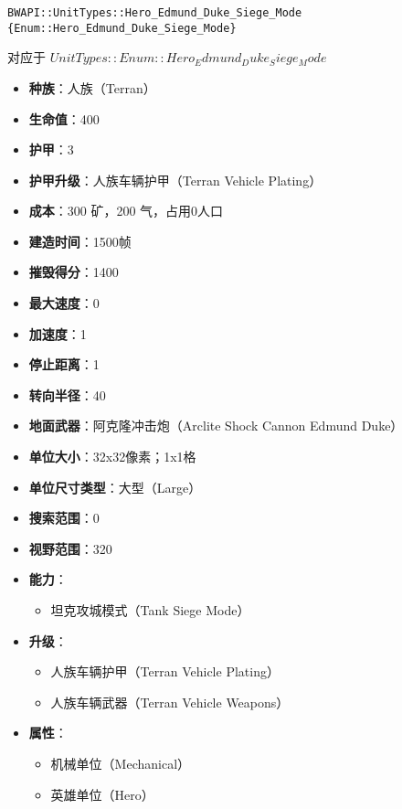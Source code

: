 \begin{tcolorbox}[colback=white, colframe=black!60!white, title=Hero\_Edmund\_Duke\_Siege\_Mode(), arc=0mm]
    \begin{verbatim}
BWAPI::UnitTypes::Hero_Edmund_Duke_Siege_Mode {Enum::Hero_Edmund_Duke_Siege_Mode}
    \end{verbatim}
    对应于  $ UnitTypes::Enum::Hero_Edmund_Duke_Siege_Mode $ 
    \begin{itemize}
        \item \textbf{种族}：人族（Terran）
        \item \textbf{生命值}：400
        \item \textbf{护甲}：3
        \item \textbf{护甲升级}：人族车辆护甲（Terran Vehicle Plating）
        \item \textbf{成本}：300 矿，200 气，占用0人口
        \item \textbf{建造时间}：1500帧
        \item \textbf{摧毁得分}：1400
        \item \textbf{最大速度}：0
        \item \textbf{加速度}：1
        \item \textbf{停止距离}：1
        \item \textbf{转向半径}：40
        \item \textbf{地面武器}：阿克隆冲击炮（Arclite Shock Cannon Edmund Duke）
        \item \textbf{单位大小}：32x32像素；1x1格
        \item \textbf{单位尺寸类型}：大型（Large）
        \item \textbf{搜索范围}：0
        \item \textbf{视野范围}：320
        \item \textbf{能力}：
            \begin{itemize}
                \item 坦克攻城模式（Tank Siege Mode）
            \end{itemize}
        \item \textbf{升级}：
            \begin{itemize}
                \item 人族车辆护甲（Terran Vehicle Plating）
                \item 人族车辆武器（Terran Vehicle Weapons）
            \end{itemize}
        \item \textbf{属性}：
            \begin{itemize}
                \item 机械单位（Mechanical）
                \item 英雄单位（Hero）
            \end{itemize}
    \end{itemize}
    
\end{tcolorbox}

